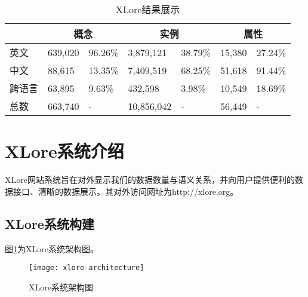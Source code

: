 \begin{table}[htb]
    \centering
  \begin{minipage}[t]{0.9\linewidth}
    \caption{XLore结果展示}
    \label{tab:xlore-result}
    \begin{tabularx}{\linewidth}{lXXXXXX}
        \toprule[1.5pt]
        \multicolumn{1}{c}{} & \multicolumn{2}{c}{概念}     & \multicolumn{2}{c}{实例}                   & \multicolumn{2}{c}{属性}    \\ \midrule[1pt]
英文            & 639,020 & 96.26\%          & 3,879,121   & 38.79\%                & 15,380  & 27.24\%                \\
中文            & 88,615  & 13.35\%          & 7,409,519   & 68.25\%                & 51,618  & 91.44\%                \\
跨语言          & 63,895  & 9.63\%           & 432,598     & 3.98\%                 & 10,549  & 18.69\%                \\
总数           & 663,740 & {-}               & 10,856,042  & {-}                    & 56,449  & {-} \\
      \bottomrule[1.5pt]
    \end{tabularx}
  \end{minipage}
\end{table}

\section{XLore系统介绍}
\label{sec5:system-describe}
XLore网站系统旨在对外显示我们的数据数量与语义关系，并向用户提供便利的数据接口、清晰的数据展示。其对外访问网址为http://xlore.org。

\subsection{XLore系统构建}
图\ref{fig:xlore-architecture}为XLore系统架构图。

\begin{figure}[H]
  \centering
  \texttt{[image: xlore-architecture]}
  \caption{XLore系统架构图}
  \label{fig:xlore-architecture}
\end{figure}

